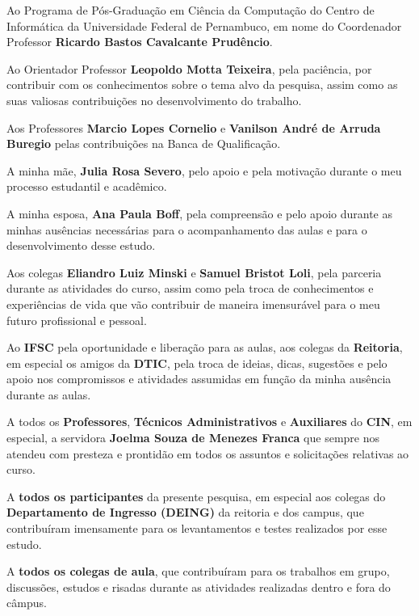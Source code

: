 \begin{agradecimentos}
Ao Programa de Pós-Graduação em Ciência da Computação do Centro de Informática da Universidade Federal de Pernambuco, em nome do Coordenador Professor \textbf{Ricardo Bastos Cavalcante Prudêncio}.

Ao Orientador Professor \textbf{Leopoldo Motta Teixeira}, pela paciência, por contribuir com os conhecimentos sobre o tema alvo da pesquisa, assim como as suas valiosas contribuições no desenvolvimento do trabalho.

Aos Professores \textbf{Marcio Lopes Cornelio} e \textbf{Vanilson André de Arruda Buregio} pelas contribuições na Banca de Qualificação.

A minha mãe, \textbf{Julia Rosa Severo}, pelo apoio e pela motivação durante o meu processo estudantil e acadêmico.

A minha esposa, \textbf{Ana Paula Boff}, pela compreensão e pelo apoio durante as minhas ausências necessárias para o acompanhamento das aulas e para o desenvolvimento desse estudo.

Aos colegas \textbf{Eliandro Luiz Minski} e \textbf{Samuel Bristot Loli}, pela parceria durante as atividades do curso, assim como pela troca de conhecimentos e experiências de vida que vão contribuir de maneira imensurável para o meu futuro profissional e pessoal.

Ao \textbf{IFSC} pela oportunidade e liberação para as aulas, aos colegas da \textbf{Reitoria}, em especial os amigos da \textbf{DTIC}, pela troca de ideias, dicas, sugestões e pelo apoio nos compromissos e atividades assumidas em função da minha ausência durante as aulas.

A todos os \textbf{Professores}, \textbf{Técnicos Administrativos} e \textbf{Auxiliares} do \textbf{CIN}, em especial, a servidora \textbf{Joelma Souza de Menezes Franca} que sempre nos atendeu com presteza e prontidão em todos os assuntos e solicitações relativas ao curso.

A \textbf{todos os participantes} da presente pesquisa, em especial aos colegas do \textbf{Departamento de Ingresso (DEING)} da reitoria e dos campus, que contribuíram imensamente para os levantamentos e testes realizados por esse estudo.

A \textbf{todos os colegas de aula}, que contribuíram para os trabalhos em grupo, discussões, estudos e risadas durante as atividades realizadas dentro e fora do câmpus. 




\end{agradecimentos}